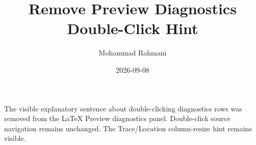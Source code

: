 \documentclass[a4paper]{article}
\title{Remove Preview Diagnostics Double-Click Hint}
\date{2026-09-08}
\author{Mohammad Rahmani}
\begin{document}
   \maketitle

   The visible explanatory sentence about double-clicking diagnostics rows was removed from the LaTeX Preview diagnostics panel. Double-click source navigation remains unchanged. The Trace/Location column-resize hint remains visible.

   
   
\end{document}

